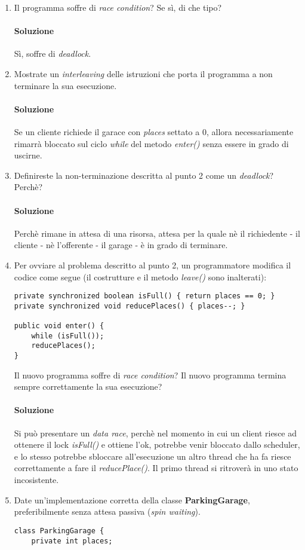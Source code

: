 \begin{enumerate}
	\item Il programma soffre di \textit{race condition}? Se s\`{i}, di che tipo?
	\paragraph{Soluzione}
	S\`i, soffre di \textit{deadlock}.
	\item Mostrate un \textit{interleaving} delle istruzioni che porta il programma a non terminare la sua esecuzione.
	\paragraph{Soluzione}
	Se un cliente richiede il garace con \textit{places} settato a $0$, allora necessariamente rimarr\`a bloccato sul ciclo \textit{while} del metodo \textit{enter()} senza essere in grado di uscirne.
	\item Definireste la non-terminazione descritta al punto 2 come un \textit{deadlock}? Perch\`{e}?
	\paragraph{Soluzione}
	Perch\`e rimane in attesa di una risorsa, attesa per la quale n\`e il richiedente - il cliente - n\`e l'offerente - il garage - \`e in grado di terminare.
	\item Per ovviare al problema descritto al punto 2, un programmatore modifica il codice come segue (il costrutture e il metodo \textit{leave()} sono inalterati):
	\begin{lstlisting}
private synchronized boolean isFull() { return places == 0; }
private synchronized void reducePlaces() { places--; }

public void enter() {
	while (isFull());
	reducePlaces();
}
	\end{lstlisting}
	Il nuovo programma soffre di \textit{race condition}? Il nuovo programma termina sempre correttamente la sua esecuzione?
	\paragraph{Soluzione}
	Si pu\`o presentare un \textit{data race}, perch\`e nel momento in cui un client riesce ad ottenere il lock \textit{isFull()} e ottiene l'ok, potrebbe venir bloccato dallo scheduler, e lo stesso potrebbe sbloccare all'esecuzione un altro thread che ha fa riesce correttamente a fare il \textit{reducePlace()}. Il primo thread si ritrover\`a in uno stato incosistente.
	\item Date un'implementazione corretta della classe \textbf{ParkingGarage}, preferibilmente senza attesa passiva (\textit{spin waiting}).
	\begin{lstlisting}
class ParkingGarage {
	private int places;
	

\end{lstlisting}
\end{enumerate}
